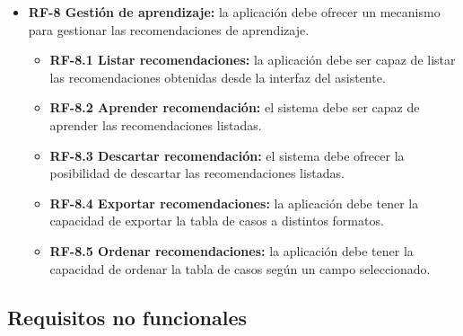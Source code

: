 \begin{itemize}
\item
\textbf{RF-8 Gestión de aprendizaje:} la aplicación debe ofrecer un mecanismo para gestionar las recomendaciones de aprendizaje.
	\begin{itemize}
	\tightlist
	\item
	\textbf{RF-8.1 Listar recomendaciones:} la aplicación debe ser capaz de listar las recomendaciones obtenidas desde la interfaz del asistente.
	\item
	\textbf{RF-8.2 Aprender recomendación:} el sistema debe ser capaz de aprender las recomendaciones listadas.
	\item
	\textbf{RF-8.3 Descartar recomendación:} el sistema debe ofrecer la posibilidad de descartar las recomendaciones listadas.
	\item
	\textbf{RF-8.4 Exportar recomendaciones:} la aplicación debe tener la capacidad de exportar la tabla de casos a distintos formatos.
	\item
	\textbf{RF-8.5 Ordenar recomendaciones:} la aplicación debe tener la capacidad de ordenar la tabla de casos según un campo seleccionado.
	\end{itemize}

\end{itemize}

\subsection{Requisitos no funcionales}

